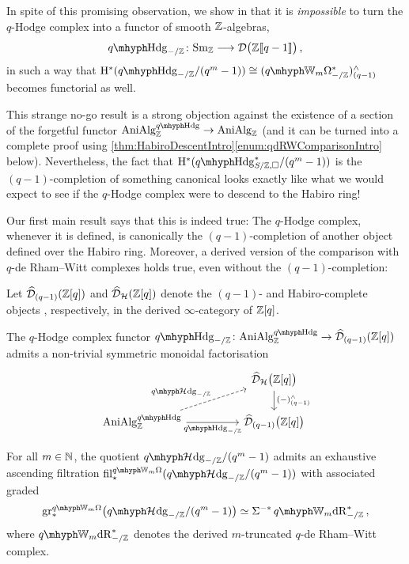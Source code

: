 \documentclass[DIV=12,numbers=enddot,leqno,bibliography=totoc]{scrartcl}
\begin{document}
\begin{numpar}
		In spite of this promising observation, we show in \cite[Theorem~]{qWitt} that it is \emph{impossible} to turn the $q$-Hodge complex into a functor of smooth $\mathbb{Z}$-algebras,
		\begin{equation*}
			\qHodge_{-/\IZ}\colon \cat{Sm}_\IZ \longrightarrow \Dd\bigl(\IZ\qpower\bigr)\,,
		\end{equation*}
		in such a way that $\H^*(\qHodge_{-/\IZ}/(q^m-1))\cong (\qIW_m\Omega_{-/\IZ}^*)_{(q-1)}^\complete$ becomes functorial as well.
		
		This strange no-go result is a strong objection against the existence of a section of the forgetful functor $\cat{AniAlg}_\IZ^{\qHodge}\rightarrow \cat{AniAlg}_\IZ$ (and it can be turned into a complete proof using \cref{thm:HabiroDescentIntro}\cref{enum:qdRWComparisonIntro} below). Nevertheless, the fact that $\H^*(\qHodge_{S/\IZ, \square}^*/(q^m-1))$ is the $(q-1)$-completion of something canonical looks exactly like what we would expect to see if the $q$-Hodge complex were to descend to the Habiro ring!
		
		Our first main result says that this is indeed true: The $q$-Hodge complex, whenever it is defined, is canonically the $(q-1)$-completion of another object defined over the Habiro ring. Moreover, a derived version of the comparison with $q$-de Rham--Witt complexes holds true, even without the $(q-1)$-completion:
	\end{numpar}
	\begin{thm}\label{thm:HabiroDescentIntro}
		Let $\widehat{\mathcal{D}}_{(q-1)}(\mathbb{Z}[q])$ and $\widehat{\mathcal{D}}_{\mathcal{H}}(\mathbb{Z}[q])$ denote the $(q-1)$- and Habiro-complete objects , respectively, in the derived $\infty$-category of $\mathbb{Z}[q]$.
		\begin{alphanumerate}
			\item The $q$-Hodge complex functor $\qHodge_{-/\IZ}\colon \cat{AniAlg}_\IZ^{\qHodge}\rightarrow \widehat{\Dd}_{(q-1)}(\IZ[q])$ admits a non-trivial symmetric monoidal factorisation\label{enum:HabiroDescentIntro}
			\begin{equation*}
				\begin{tikzcd}[column sep=huge]
					& \widehat{\Dd}_\Hh\bigl(\IZ[q]\bigr)\dar["(-)_{(q-1)}^\complete"]\\
					\cat{AniAlg}_\IZ^{\qHodge}\rar["\qHodge_{-/\IZ}"']\urar[dashed,"\qHhodge_{-/\IZ}"] & \widehat{\Dd}_{(q-1)}\bigl(\IZ[q]\bigr)
				\end{tikzcd}
			\end{equation*}
			\item For all $m\in\mathbb{N}$, the quotient $\qHhodge_{-/\IZ}/(q^m-1)$ admits an exhaustive ascending filtration $ \fil_\star ^{\qIW_m\Omega}(\qHhodge_{-/\IZ}/(q^m-1))$ with associated graded\label{enum:qdRWComparisonIntro}
			\begin{equation*}
				\gr_*^{\qIW_m\Omega}\bigl(\qHhodge_{-/\IZ}/(q^m-1)\bigr)\simeq \Sigma^{-*}\qIW_m\deRham_{-/\IZ}^*\,,
			\end{equation*}
			where $\qIW_m\deRham_{-/\IZ}^*$ denotes the derived $m$-truncated $q$-de Rham--Witt complex. 
		\end{alphanumerate}
	\end{thm}
\end{document}
